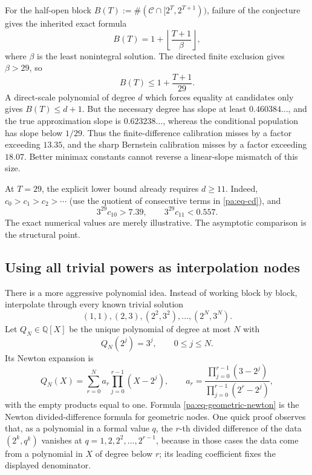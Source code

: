 \documentclass[11pt,oneside]{article}
\theoremstyle{definition}
\theoremstyle{remark}
\newcommand{\Q}{\mathbb Q}
\newcommand{\Cand}{\mathcal C}
\begin{document}
For the half-open block
\(B(T):=\#(\Cand\cap[2^T,2^{T+1}))\), failure of the conjecture gives the inherited exact formula
\begin{equation}
 B(T)=1+\left\lfloor\frac{T+1}{\beta}\right\rfloor,
 \label{pa:eq-block-count-beta}
\end{equation}
where \(\beta\) is the least nonintegral solution.  The directed finite exclusion gives
\(\beta>29\), so
\[
 B(T)\le1+\frac{T+1}{29}.
\]
A direct-scale polynomial of degree \(d\) which forces equality at candidates only gives
\(B(T)\le d+1\).  But the necessary degree has slope at least
\(0.460384\ldots\), and the true approximation slope is
\(0.623238\ldots\), whereas the conditional population has slope below \(1/29\).  Thus the
finite-difference calibration misses by a factor exceeding \(13.35\), and the sharp
Bernstein calibration misses by a factor exceeding \(18.07\).  Better minimax constants
cannot reverse a linear-slope mismatch of this size.

At \(T=29\), the explicit lower bound already requires \(d\ge11\).  Indeed,
\(c_0>c_1>c_2>\cdots\) (use the quotient of consecutive terms in
\eqref{pa:eq-cd}), and
\[
 3^{29}c_{10}>7.39,
 \qquad
 3^{29}c_{11}<0.557.
\]
The exact numerical values are merely illustrative.  The asymptotic comparison is the
structural point.

\subsection{Using all trivial powers as interpolation nodes}

There is a more aggressive polynomial idea.  Instead of working block by block, interpolate
through every known trivial solution
\[
  (1,1),(2,3),(2^2,3^2),\ldots,(2^N,3^N).
\]
Let \(Q_N\in\Q[X]\) be the unique polynomial of degree at most \(N\) with
\begin{equation}
 Q_N(2^j)=3^j,
 \qquad 0\le j\le N.
 \label{pa:eq-trivial-interpolant}
\end{equation}
Its Newton expansion is
\begin{equation}
 Q_N(X)=\sum_{r=0}^{N}a_r\prod_{j=0}^{r-1}(X-2^j),
 \qquad
 a_r=\frac{\prod_{j=0}^{r-1}(3-2^j)}
 {\prod_{j=0}^{r-1}(2^r-2^j)},
 \label{pa:eq-geometric-newton}
\end{equation}
with the empty products equal to one.  Formula \eqref{pa:eq-geometric-newton} is the Newton
divided-difference formula for geometric nodes.  One quick proof observes that, as a
polynomial in a formal value \(q\), the \(r\)-th divided difference of the data
\((2^k,q^k)\) vanishes at \(q=1,2,2^2,\ldots,2^{r-1}\), because in those cases the data come
from a polynomial in \(X\) of degree below \(r\); its leading coefficient fixes the displayed
denominator.
\end{document}
